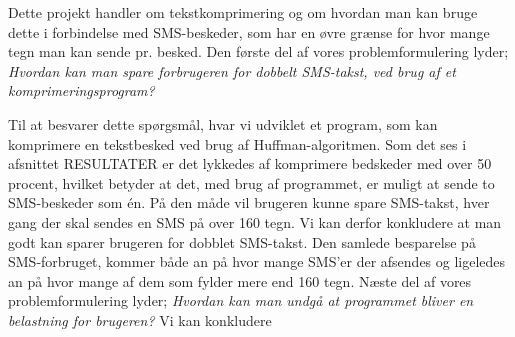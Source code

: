 Dette projekt handler om tekstkomprimering og om hvordan man kan bruge dette i forbindelse med SMS-beskeder, som har en øvre grænse for hvor mange tegn man kan sende pr. besked. Den første del af vores problemformulering lyder;
\emph{Hvordan kan man spare forbrugeren for dobbelt SMS-takst, ved brug af et komprimeringsprogram?}

Til at besvarer dette spørgsmål, hvar vi udviklet et program, som kan komprimere en tekstbesked ved brug af Huffman-algoritmen. Som det ses i afsnittet RESULTATER er det lykkedes af komprimere bedskeder med over 50 procent, hvilket betyder at det, med brug af programmet, er muligt at sende to SMS-beskeder som én. På den måde vil brugeren kunne spare SMS-takst, hver gang der skal sendes en SMS på over 160 tegn.
Vi kan derfor konkludere at man godt kan sparer brugeren for dobblet SMS-takst. Den samlede besparelse på SMS-forbruget, kommer både an på hvor mange SMS'er der afsendes og ligeledes an på hvor mange af dem som fylder mere end 160 tegn. 
Næste del af vores problemformulering lyder;
\emph{Hvordan kan man undgå at programmet bliver en belastning for brugeren?} 
Vi kan konkludere 

